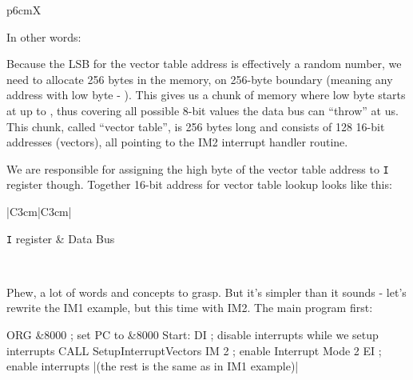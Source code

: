 \begin{tabularx}{\linewidth}{p{6cm}X}
	\begin{description}[topsep=0pt,itemsep=1pt,labelindent=-1.25ex,leftmargin=0cm]
		\item In other words:
		
		\item Because the LSB for the vector table address is effectively a random number, we need to allocate 256 bytes in the memory, on 256-byte boundary (meaning any address with low byte  - ). This gives us a chunk of memory where low byte starts at  up to , thus covering all possible 8-bit values the data bus can ``throw'' at us. This chunk, called ``vector table'', is 256 bytes long and consists of 128 16-bit addresses (vectors), all pointing to the IM2 interrupt handler routine.
		
		\item We are responsible for assigning the high byte of the vector table address to {\tt I} register though. Together 16-bit address for vector table lookup looks like this:
	\end{description}
	
	\vspace*{1ex}

	{ %
	\begin{ElegantTable}{|C{3cm}|C{3cm}|}
		\ElegantHeader{\EH{15-8} & \EH{7-0}}

		{\tt I} register & Data Bus \\
	\end{ElegantTable}
	}

	\\
\end{tabularx}

Phew, a lot of words and concepts to grasp. But it's simpler than it sounds - let's rewrite the IM1 example, but this time with IM2. The main program first:

\begin{tcblisting}{}
	ORG &8000              ; set PC to &8000
Start:
	DI                     ; disable interrupts while we setup interrupts
	CALL SetupInterruptVectors
	IM 2                   ; enable Interrupt Mode 2
	EI                     ; enable interrupts
	|(the rest is the same as in IM1 example)|
\end{tcblisting}

